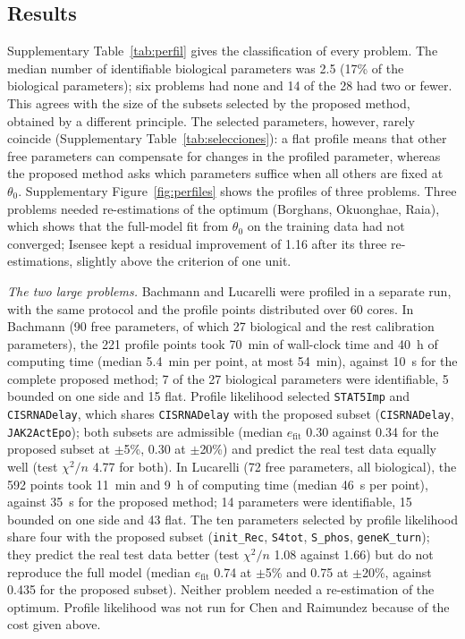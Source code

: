 \subsection*{Results}
Supplementary Table~\ref{tab:perfil} gives the classification of every problem. The median number of identifiable biological parameters was 2.5 (17\% of the biological parameters); six problems had none and 14 of the 28 had two or fewer. This agrees with the size of the subsets selected by the proposed method, obtained by a different principle. The selected parameters, however, rarely coincide (Supplementary Table~\ref{tab:selecciones}): a flat profile means that other free parameters can compensate for changes in the profiled parameter, whereas the proposed method asks which parameters suffice when all others are fixed at $\theta_0$. Supplementary Figure~\ref{fig:perfiles} shows the profiles of three problems. Three problems needed re-estimations of the optimum (Borghans, Okuonghae, Raia), which shows that the full-model fit from $\theta_0$ on the training data had not converged; Isensee kept a residual improvement of 1.16 after its three re-estimations, slightly above the criterion of one unit.

\emph{The two large problems.} Bachmann and Lucarelli were profiled in a separate run, with the same protocol and the profile points distributed over 60 cores. In Bachmann (90 free parameters, of which 27 biological and the rest calibration parameters), the 221 profile points took 70~min of wall-clock time and 40~h of computing time (median 5.4~min per point, at most 54~min), against 10~s for the complete proposed method; 7 of the 27 biological parameters were identifiable, 5 bounded on one side and 15 flat. Profile likelihood selected \texttt{STAT5Imp} and \texttt{CISRNADelay}, which shares \texttt{CISRNADelay} with the proposed subset (\texttt{CISRNADelay}, \texttt{JAK2ActEpo}); both subsets are admissible (median $e_{\mathrm{fit}}$ 0.30 against 0.34 for the proposed subset at $\pm$5\%, 0.30 at $\pm$20\%) and predict the real test data equally well (test $\chi^2/n$ 4.77 for both). In Lucarelli (72 free parameters, all biological), the 592 points took 11~min and 9~h of computing time (median 46~s per point), against 35~s for the proposed method; 14 parameters were identifiable, 15 bounded on one side and 43 flat. The ten parameters selected by profile likelihood share four with the proposed subset (\texttt{init\_Rec}, \texttt{S4tot}, \texttt{S\_phos}, \texttt{geneK\_turn}); they predict the real test data better (test $\chi^2/n$ 1.08 against 1.66) but do not reproduce the full model (median $e_{\mathrm{fit}}$ 0.74 at $\pm$5\% and 0.75 at $\pm$20\%, against 0.435 for the proposed subset). Neither problem needed a re-estimation of the optimum. Profile likelihood was not run for Chen and Raimundez because of the cost given above.

